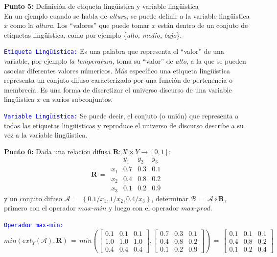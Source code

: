 \documentclass[10pt,onecolumn,twoside,letterpaper]{article}
\begin{document}
\par{\bf \large Punto 5:} Definici\'on de etiqueta ling\"uistica y variable ling\"uistica\\
En un ejemplo cuando se habla de \emph{altura}, se puede definir a la variable ling\"uistica $x$ como la \emph{altura}. Los ``valores'' que puede tomar $x$ est\'an dentro de un conjuto de etiquetas ling\"uistica, como por ejemplo \{\emph{alto, medio, bajo}\}.
\par \textcolor{blue}{\texttt{Etiqueta Ling\"uistica:}} Es una palabra que representa el ``valor'' de una variable, por ejemplo \emph{la temperatura}, toma su ``valor'' de \emph{alto}, a la que se pueden asociar diferentes valores n\'umericos. M\'as espec\'ifico una etiqueta ling\"uistica representa un conjuto difuso caracterizado por una funci\'on de pertenencia o membrec\'ia. Es una forma de discretizar el universo discurso de una variable ling\"uistica $x$ en varios subconjuntos.
\par \textcolor{blue}{\texttt{Variable Ling\"uistica:}} Se puede decir, el conjuto (o uni\'on) que representa a todas las etiquetas ling\"uisticas y reproduce el universo de discurso describe a su vez a la variable ling\"uistica.
\par{\bf \large Punto 6:} Dada una relacion difusa $\mathbf{R}:X\times Y\to[0,1]$:\\
\begin{equation*}
  \label{eq:relation}
  \mathbf{R}\,=\,
  \begin{array}{cccc}
    &y_1&y_2&y_3\\
    x_1&0.7&0.3&0.1\\
    x_2&0.4&0.8&0.2\\
    x_3&0.1&0.2&0.9
  \end{array}
\end{equation*}
y un conjuto difuso $\mathcal{A}\,=\,\left\{0.1/x_1,1/x_2,0.4/x_3\right\}$, determinar $\mathcal{B}\,=\,\mathcal{A}\circ\mathbf{R}$, primero con el operador $max$-$min$ y luego con el operador $max$-$prod$.
\par \textcolor{blue}{\texttt{Operador max-min:}} 
\begin{equation*}
  \label{eq:relation}
  min(ext_Y(\mathcal{A}),\mathbf{R})\,=\,min\left(\left[
  \begin{array}{ccc}
    0.1&0.1&0.1\\
    1.0&1.0&1.0\\
    0.4&0.4&0.4
  \end{array}\right],\left[
  \begin{array}{ccc}
    0.7&0.3&0.1\\
    0.4&0.8&0.2\\
    0.1&0.2&0.9
  \end{array}\right]\right)\,=\,\left[
  \begin{array}{ccc}
    0.1&0.1&0.1\\
    0.4&0.8&0.2\\
    0.1&0.2&0.4
  \end{array}\right]
\end{equation*}
\end{document}
